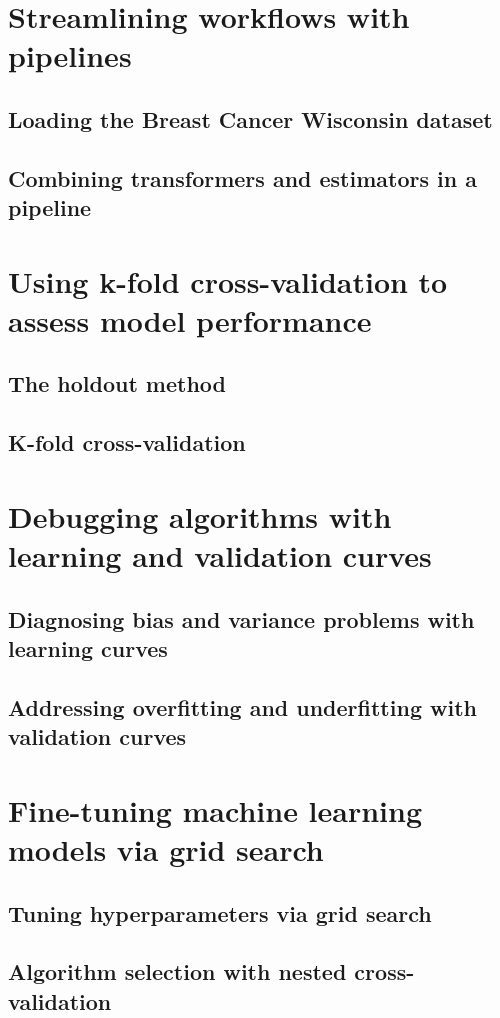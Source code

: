\documentclass[letterpaper]{report}
\begin{document}
\section{Streamlining workflows with pipelines}
\subsection{Loading the Breast Cancer Wisconsin dataset}
\subsection{Combining transformers and estimators in a pipeline}
\section{Using k-fold cross-validation to assess model performance}
\subsection{The holdout method}
\subsection{K-fold cross-validation}
\section{Debugging algorithms with learning and validation curves}
\subsection{Diagnosing bias and variance problems with learning curves}
\subsection{Addressing overfitting and underfitting with validation curves}
\section{Fine-tuning machine learning models via grid search}
\subsection{Tuning hyperparameters via grid search}
\subsection{Algorithm selection with nested cross-validation}
\end{document}
